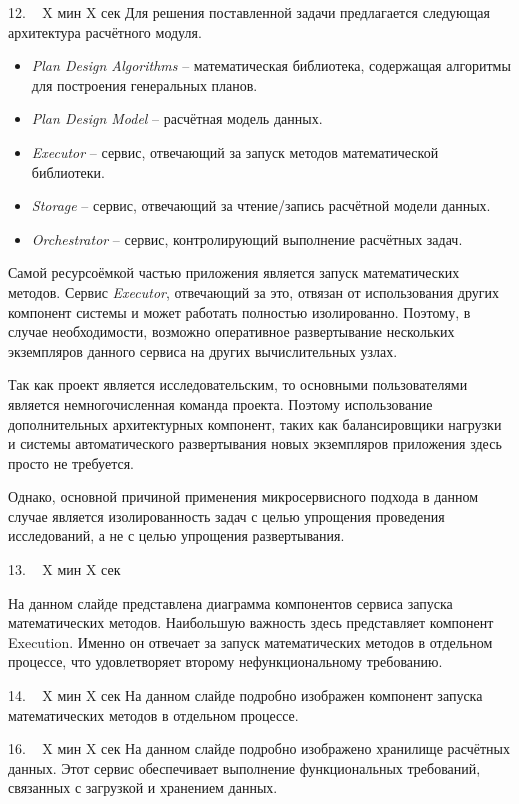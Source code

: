 \documentclass[11pt]{article}
\begin{document}
    12. ~ X мин X сек
    Для решения поставленной задачи предлагается следующая архитектура расчётного модуля.
    \begin{itemize}
        \item \textit{Plan Design Algorithms} -- математическая библиотека, содержащая алгоритмы
        для построения генеральных планов.
        \item \textit{Plan Design Model} -- расчётная модель данных.
        \item \textit{Executor} -- сервис, отвечающий за запуск методов математической библиотеки.
        \item \textit{Storage} -- сервис, отвечающий за чтение/запись расчётной модели данных.
        \item \textit{Orchestrator} -- сервис, контролирующий выполнение расчётных задач.

    \end{itemize}

    Самой ресурсоёмкой частью приложения является запуск математических методов.
    Сервис \textit{Executor}, отвечающий за это, отвязан от использования других компонент системы
    и может работать полностью изолированно.
    Поэтому, в случае необходимости, возможно оперативное развертывание нескольких экземпляров данного сервиса
    на других вычислительных узлах.

    Так как проект является исследовательским, то основными пользователями является немногочисленная команда проекта.
    Поэтому использование дополнительных архитектурных компонент,
    таких как балансировщики нагрузки и системы автоматического развертывания новых экземпляров приложения
    здесь просто не требуется.

    Однако, основной причиной применения микросервисного подхода в данном случае является изолированность задач с целью
    упрощения проведения исследований, а не с целью упрощения развертывания.

    13. ~ X мин X сек

    На данном слайде представлена диаграмма компонентов сервиса запуска математических методов.
    Наибольшую важность здесь представляет компонент Execution. Именно он отвечает за запуск математических методов
    в отдельном процессе, что удовлетворяет второму нефункциональному требованию.

    14. ~ X мин X сек
    На данном слайде подробно изображен компонент запуска математических методов в отдельном процессе.

    16. ~ X мин X сек
    На данном слайде подробно изображено хранилище расчётных данных.
    Этот сервис обеспечивает выполнение функциональных требований, связанных с загрузкой и хранением данных.
\end{document}
